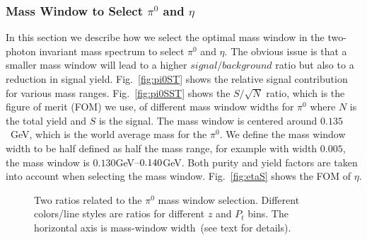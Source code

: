 \subsubsection{\texorpdfstring{Mass Window to Select $\pi^0$ and $\eta$}{Mass Window to Select pi0 and eta}}
\label{sec:masswindow}
In this section we describe how we select the optimal mass window in the two-photon invariant mass spectrum 
 to select $\pi^0$ and $\eta$. The obvious issue is that a smaller mass window will lead to a higher $signal/background$ ratio but also to a reduction in signal yield. Fig.~\ref{fig:pi0ST} shows the relative signal contribution for various mass ranges. Fig.~\ref{fig:pi0SST} shows the $S/\sqrt{N}$ ratio, which is the figure of merit (FOM) we use, of different mass window widths for $\pi^0$ where $N$ is the total yield and $S$ is the signal. The mass window is centered around $0.135$~GeV, which is the world average mass for the  $\pi^0$. We define the mass window width to be half  defined as half the mass range, for example with width $0.005$, the mass window is $0.130$GeV$\textup{--}0.140$GeV. Both purity and yield factors are taken into account when selecting the mass window. Fig.~\ref{fig:etaS} shows the FOM of $\eta$.
\begin{figure}[h]
\centering     %
{}
\caption{Two ratios related to the $\pi^0$ mass window selection. Different colors/line styles are ratios for different $z$ and $P_t$ bins. The horizontal axis is mass-window width~(see text for details).}
\label{fig:pi0S}
\end{figure}

